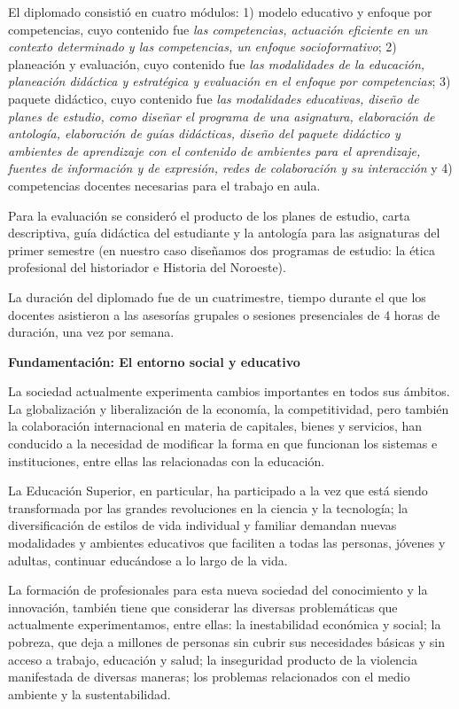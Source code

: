 El diplomado consistió en cuatro módulos: 1) modelo educativo y enfoque por
competencias, cuyo contenido fue \textit{las competencias, actuación eficiente en un
contexto determinado y las competencias, un enfoque socioformativo}; 2)
planeación y evaluación, cuyo contenido fue \textit{las modalidades de la
educación, planeación didáctica y estratégica y evaluación en el enfoque
por competencias}; 3) paquete didáctico, cuyo contenido fue \textit{las modalidades
educativas, diseño de planes de estudio, como diseñar el programa de una
asignatura, elaboración de antología, elaboración de guías didácticas,
diseño del paquete didáctico y ambientes de aprendizaje con el contenido de
ambientes para el aprendizaje, fuentes de información y de expresión, redes
de colaboración y su interacción} y 4) competencias docentes necesarias para el
trabajo en aula. 

Para la evaluación se consideró el producto de los planes de estudio,  carta
descriptiva, guía didáctica del estudiante y la antología para las
asignaturas del primer semestre (en nuestro caso diseñamos dos  programas
de estudio: la ética profesional del historiador e Historia del Noroeste).

La duración del diplomado fue de un cuatrimestre, tiempo durante el que los docentes
asistieron a las asesorías grupales o sesiones presenciales de 4 horas de
duración, una vez por semana.

\medskip
\textbf{Fundamentación: El entorno social y educativo}

La sociedad actualmente experimenta cambios importantes en todos sus
ámbitos. La globalización y liberalización de la economía, la
competitividad, pero también la colaboración internacional en materia de
capitales, bienes y servicios, han conducido a la necesidad de modificar la
forma en que funcionan los sistemas e instituciones, entre ellas las relacionadas
con la educación.

La Educación Superior, en particular, ha participado a la vez que está siendo
transformada por las grandes revoluciones en la ciencia y la tecnología; la
diversificación de estilos de vida individual y familiar demandan nuevas
modalidades y ambientes educativos que faciliten a todas las personas,
jóvenes y adultas, continuar educándose a lo largo de la vida. 

La formación de profesionales para esta nueva sociedad del conocimiento y la
innovación, también tiene que considerar las diversas problemáticas que
actualmente experimentamos, entre ellas: la inestabilidad económica y
social; la pobreza, que deja a millones de personas sin cubrir sus
necesidades básicas y sin acceso a trabajo, educación y salud; la
inseguridad producto de la violencia manifestada de diversas maneras; los
problemas relacionados con el medio ambiente y la sustentabilidad.

